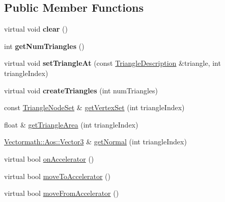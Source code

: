 \subsection*{Public Member Functions}
\begin{DoxyCompactItemize}
\item 
\hypertarget{classbt_soft_body_triangle_data_af95b62a62097f43cff33abe975a3bf27}{virtual void {\bfseries clear} ()}\label{classbt_soft_body_triangle_data_af95b62a62097f43cff33abe975a3bf27}

\item 
\hypertarget{classbt_soft_body_triangle_data_a8707741f24401c11254dff4c8567342c}{int {\bfseries get\+Num\+Triangles} ()}\label{classbt_soft_body_triangle_data_a8707741f24401c11254dff4c8567342c}

\item 
\hypertarget{classbt_soft_body_triangle_data_a836e70484d0c58d7db818088f9543fc4}{virtual void {\bfseries set\+Triangle\+At} (const \hyperlink{classbt_soft_body_triangle_data_1_1_triangle_description}{Triangle\+Description} \&triangle, int triangle\+Index)}\label{classbt_soft_body_triangle_data_a836e70484d0c58d7db818088f9543fc4}

\item 
\hypertarget{classbt_soft_body_triangle_data_ae3110e218d2edb0805d73e124c373e05}{virtual void {\bfseries create\+Triangles} (int num\+Triangles)}\label{classbt_soft_body_triangle_data_ae3110e218d2edb0805d73e124c373e05}

\item 
const \hyperlink{classbt_soft_body_triangle_data_1_1_triangle_node_set}{Triangle\+Node\+Set} \& \hyperlink{classbt_soft_body_triangle_data_a88e1d23b6229d976968fe9ad3335baa5}{get\+Vertex\+Set} (int triangle\+Index)
\item 
float \& \hyperlink{classbt_soft_body_triangle_data_a626c0aac69b35b17f2bbfc084f00a164}{get\+Triangle\+Area} (int triangle\+Index)
\item 
\hyperlink{class_vectormath_1_1_aos_1_1_vector3}{Vectormath\+::\+Aos\+::\+Vector3} \& \hyperlink{classbt_soft_body_triangle_data_a4b93ad32b7b619bf99f952f7b662469d}{get\+Normal} (int triangle\+Index)
\item 
virtual bool \hyperlink{classbt_soft_body_triangle_data_a7e461faee6801a25e4ccdf108d55ed54}{on\+Accelerator} ()
\item 
virtual bool \hyperlink{classbt_soft_body_triangle_data_a64a1971c6c64d80cc8cd488cb11208a6}{move\+To\+Accelerator} ()
\item 
virtual bool \hyperlink{classbt_soft_body_triangle_data_aa89f5f9a27c9350a95179535c4aaaf8c}{move\+From\+Accelerator} ()
\end{DoxyCompactItemize}

